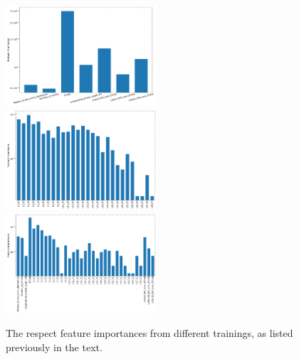 \begin{figure}[p]
\begin{center}
    \includegraphics[width=0.5\textwidth]{Fig/fig_HGCAL/featimp-7vars-v6-XGBClassifier}~
    \includegraphics[width=0.5\textwidth]{Fig/fig_HGCAL/featimp-28vars-v7-XGBClassifier}\\
    \includegraphics[width=0.5\textwidth]{Fig/fig_HGCAL/featimp-35vars-v6-XGBClassifier}~
    \caption{The respect feature importances from different trainings, as listed previously in the text.}
    \label{fig:featimp-vars}
    \end{center}
\end{figure}

